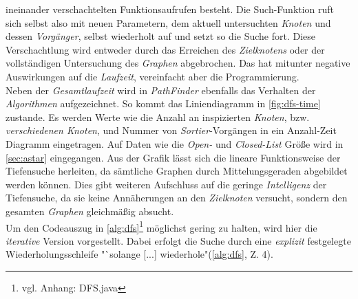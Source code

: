 \documentclass[12pt]{article}
\begin{document}
\noindent ineinander verschachtelten Funktionsaufrufen besteht. Die Such-Funktion ruft sich selbst also mit neuen Parametern, dem aktuell untersuchten \textit{Knoten} und dessen \textit{Vorgänger}, selbst wiederholt auf und setzt so die Suche fort. Diese Verschachtlung wird entweder durch das Erreichen des \textit{Zielknotens} oder der vollständigen Untersuchung des \textit{Graphen} abgebrochen. Das hat mitunter negative Auswirkungen auf die \textit{Laufzeit}, vereinfacht aber die Programmierung. 
\\
Neben der \textit{Gesamtlaufzeit} wird in \textit{PathFinder} ebenfalls das Verhalten der \textit{Algorithmen} aufgezeichnet. So kommt das Liniendiagramm in \autoref{fig:dfs-time} zustande. Es werden Werte wie die Anzahl an inspizierten \textit{Knoten}, bzw. \textit{verschiedenen Knoten}, und Nummer von \textit{Sortier}-Vorgängen in ein Anzahl-Zeit Diagramm eingetragen. Auf Daten wie die \textit{Open-} und \textit{Closed-List} Größe wird in \autoref{sec:astar} eingegangen. Aus der Grafik lässt sich die lineare Funktionsweise der Tiefensuche herleiten, da sämtliche Graphen durch Mittelungsgeraden abgebildet werden können. Dies gibt weiteren Aufschluss auf die geringe \textit{Intelligenz} der Tiefensuche, da sie keine Annäherungen an den \textit{Zielknoten} versucht, sondern den gesamten \textit{Graphen} gleichmäßig absucht.
\\
Um den Codeauszug in \autoref{alg:dfs}\footnote{vgl. Anhang: DFS.java} möglichst gering zu halten, wird hier die \textit{iterative} Version vorgestellt. Dabei erfolgt die Suche durch eine \textit{explizit} festgelegte Wiederholungsschleife "`solange [...] wiederhole"(\autoref{alg:dfs}, Z. 4). 
\end{document}
